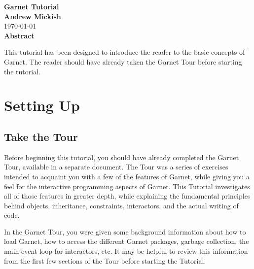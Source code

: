 
\begin{titlepage}
\vspace{0.6in}

\begin{center} 

\Large{\textbf{Garnet Tutorial}} \\

{\bf Andrew Mickish}  \\
\today{} \\
{\bf Abstract}
\end{center}
  This tutorial has been designed to introduce the reader to the basic
  concepts of Garnet.  The reader should have already taken the Garnet
  Tour before starting the tutorial.
  \vspace{\fill}
  
\end{titlepage}

\tableofcontents{}


% 

\chapter{Setting Up}

\section{Take the Tour}

Before beginning this tutorial, you should have already completed the
Garnet Tour, available in a separate document.  The Tour was a series
of exercises intended to acquaint you with a few of the features of
Garnet, while giving you a feel for the interactive programming aspects
of Garnet.  This Tutorial investigates all of those features in
greater depth, while explaining the fundamental principles behind
objects, inheritance, constraints, interactors, and the actual writing
of code.

In the Garnet Tour, you were given some background information about
how to load Garnet, how to access the different Garnet packages,
garbage collection, the main-event-loop for interactors, etc.  It may
be helpful to review this information from the first few sections of
the Tour before starting the Tutorial.


